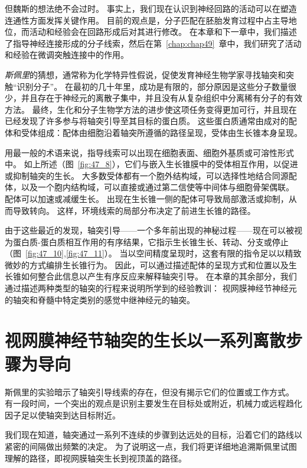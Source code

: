 但魏斯的想法绝不会过时。
事实上，我们现在认识到神经回路的活动可以在塑造连通性方面发挥关键作用。
目前的观点是，分子匹配在胚胎发育过程中占主导地位，而活动和经验会在回路形成后对其进行修改。
在本章和下一章中，我们描述了指导神经连接形成的分子线索，然后在第~\ref{chap:chap49}~章中，我们研究了活动和经验在微调突触连接中的作用。


\textit{斯佩里}的猜想，通常称为化学特异性假说，促使发育神经生物学家寻找轴突和突触“识别分子”。
在最初的几十年里，成功是有限的，部分原因是这些分子数量很少，并且存在于神经元的离散子集中，并且没有从复杂组织中分离稀有分子的有效方法。
最终，生化和分子生物学方法的进步使这项任务变得更加可行，并且现在已经发现了许多参与将轴突引导至其目标的蛋白质。
这些蛋白质通常由成对的配体和受体组成：配体由细胞沿着轴突所遵循的路径呈现，受体由生长锥本身呈现。


用最一般的术语来说，指导线索可以出现在细胞表面、细胞外基质或可溶性形式中。
如上所述（图~\ref{fig:47_8}），它们与嵌入生长锥膜中的受体相互作用，以促进或抑制轴突的生长。
大多数受体都有一个胞外结构域，可以选择性地结合同源配体，以及一个胞内结构域，可以直接或通过第二信使等中间体与细胞骨架偶联。
配体可以加速或减缓生长。
出现在生长锥一侧的配体可导致局部激活或抑制，从而导致转向。
这样，环境线索的局部分布决定了前进生长锥的路径。


由于这些最近的发现，轴突引导——一个多年前出现的神秘过程——现在可以被视为蛋白质-蛋白质相互作用的有序结果，它指示生长锥生长、转动、分支或停止（图~\ref{fig:47_10},\ref{fig:47_11}）。
当以空间精度呈现时，这套有限的指令足以以精致微妙的方式编排生长锥行为。
因此，可以通过描述配体的呈现方式和位置以及生长锥如何整合此信息以产生有序反应来解释轴突引导。
在本章的其余部分，我们通过描述两种类型的轴突的行程来说明所学到的经验教训：
视网膜神经节神经元的轴突和脊髓中特定类别的感觉中继神经元的轴突。



\section{视网膜神经节轴突的生长以一系列离散步骤为导向}

斯佩里的实验暗示了轴突引导线索的存在，但没有揭示它们的位置或工作方式。
有一段时间，一个突出的观点是识别主要发生在目标处或附近，机械力或远程趋化因子足以使轴突到达目标附近。


我们现在知道，轴突通过一系列不连续的步骤到达远处的目标，沿着它们的路线以紧密的间隔做出频繁的决定。
为了说明这一点，我们将更详细地追溯斯佩里试图理解的路径，即视网膜轴突生长到视顶盖的路径。



